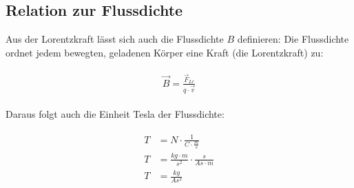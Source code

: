 \subsection{Relation zur Flussdichte}

Aus der Lorentzkraft lässt sich auch die Flussdichte $B$ definieren: Die Flussdichte ordnet jedem bewegten, geladenen Körper eine Kraft (die Lorentzkraft) zu:

\begin{align} \label{eq:Flussdichte}
\begin{split}
	\vec{B} = \frac{\vec{F}_{Lr}}{q \cdot \vec{v}}
\end{split}
\end{align}

\noindent Daraus folgt auch die Einheit Tesla der Flussdichte:

\begin{align} \label{eq:Flussdichte}
\begin{split}
	T &= N \cdot \frac{1}{C \cdot \frac{m}{s}} \\
	T &= \frac{kg \cdot m}{s^2} \cdot \frac{s}{As \cdot m} \\
	T &= \frac{kg}{As^2}	
\end{split}
\end{align}





